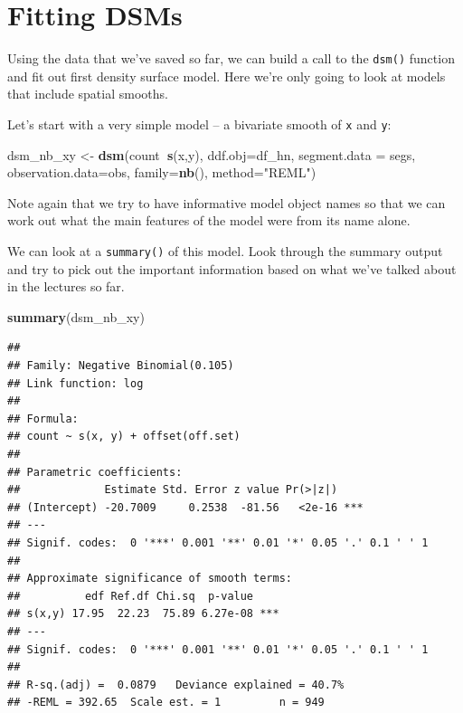 \documentclass[]{book}
\newenvironment{Shaded}{\begin{snugshade}}{\end{snugshade}}
\newcommand{\KeywordTok}[1]{\textcolor[rgb]{0.13,0.29,0.53}{\textbf{#1}}}
\newcommand{\DataTypeTok}[1]{\textcolor[rgb]{0.13,0.29,0.53}{#1}}
\newcommand{\StringTok}[1]{\textcolor[rgb]{0.31,0.60,0.02}{#1}}
\newcommand{\OperatorTok}[1]{\textcolor[rgb]{0.81,0.36,0.00}{\textbf{#1}}}
\newcommand{\NormalTok}[1]{#1}
\theoremstyle{definition}
\theoremstyle{definition}
\theoremstyle{remark}
\begin{document}
\section{Fitting DSMs}\label{fitting-dsms}

Using the data that we've saved so far, we can build a call to the
\texttt{dsm()} function and fit out first density surface model. Here
we're only going to look at models that include spatial smooths.

Let's start with a very simple model -- a bivariate smooth of \texttt{x}
and \texttt{y}:

\begin{Shaded}
\begin{Highlighting}[]
\NormalTok{dsm_nb_xy <-}\StringTok{ }\KeywordTok{dsm}\NormalTok{(count}\OperatorTok{~}\KeywordTok{s}\NormalTok{(x,y),}
                 \DataTypeTok{ddf.obj=}\NormalTok{df_hn, }\DataTypeTok{segment.data =}\NormalTok{ segs, }\DataTypeTok{observation.data=}\NormalTok{obs,}
                 \DataTypeTok{family=}\KeywordTok{nb}\NormalTok{(), }\DataTypeTok{method=}\StringTok{"REML"}\NormalTok{)}
\end{Highlighting}
\end{Shaded}

Note again that we try to have informative model object names so that we
can work out what the main features of the model were from its name
alone.

We can look at a \texttt{summary()} of this model. Look through the
summary output and try to pick out the important information based on
what we've talked about in the lectures so far.

\begin{Shaded}
\begin{Highlighting}[]
\KeywordTok{summary}\NormalTok{(dsm_nb_xy)}
\end{Highlighting}
\end{Shaded}

\begin{verbatim}
## 
## Family: Negative Binomial(0.105) 
## Link function: log 
## 
## Formula:
## count ~ s(x, y) + offset(off.set)
## 
## Parametric coefficients:
##             Estimate Std. Error z value Pr(>|z|)    
## (Intercept) -20.7009     0.2538  -81.56   <2e-16 ***
## ---
## Signif. codes:  0 '***' 0.001 '**' 0.01 '*' 0.05 '.' 0.1 ' ' 1
## 
## Approximate significance of smooth terms:
##          edf Ref.df Chi.sq  p-value    
## s(x,y) 17.95  22.23  75.89 6.27e-08 ***
## ---
## Signif. codes:  0 '***' 0.001 '**' 0.01 '*' 0.05 '.' 0.1 ' ' 1
## 
## R-sq.(adj) =  0.0879   Deviance explained = 40.7%
## -REML = 392.65  Scale est. = 1         n = 949
\end{verbatim}
\end{document}
